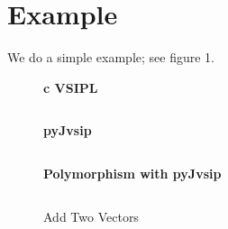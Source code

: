 \section*{Example}
We do a simple example; see figure 1. 

\begin{figure}[t]
\caption{Add Two Vectors}
\setlength{\parskip}{.25cm}
\begin{minipage}[t][5cm][t]{.5\textwidth}
{\begin{center} \bfseries{c VSIPL} \end{center}}\setlength{\parskip}{.25cm}
\inputminted[linenos=true,resetmargins=true,xleftmargin=.75cm,fontfamily=tt, fontsize= \tiny]{c}{./c_examples/example1.c}
\end{minipage}
\begin{minipage}[t][5cm][t]{.5\textwidth}
{\begin{center} \bfseries{pyJvsip} \end{center}}\setlength{\parskip}{.25cm}
\inputminted[linenos=true,resetmargins=true,xleftmargin=.75cm,fontfamily=tt,fontsize=\tiny]{python}{./pyJvsip_examples/example1a.py}\setlength{\parskip}{.25cm}
{\begin{center} \bfseries{Polymorphism with pyJvsip} \end{center}}\setlength{\parskip}{.25cm}
\inputminted[linenos=true,resetmargins=true,xleftmargin=.75cm,fontfamily=tt,fontsize=\tiny]{python}{./pyJvsip_examples/example1b.py}
\end{minipage}
\end{figure}
